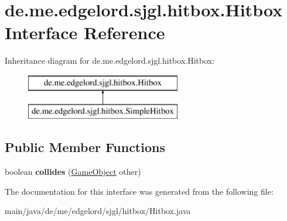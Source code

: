 \hypertarget{interfacede_1_1me_1_1edgelord_1_1sjgl_1_1hitbox_1_1_hitbox}{}\section{de.\+me.\+edgelord.\+sjgl.\+hitbox.\+Hitbox Interface Reference}
\label{interfacede_1_1me_1_1edgelord_1_1sjgl_1_1hitbox_1_1_hitbox}
Inheritance diagram for de.\+me.\+edgelord.\+sjgl.\+hitbox.\+Hitbox\+:\begin{figure}[H]
\begin{center}
\leavevmode
\includegraphics[height=2.000000cm]{interfacede_1_1me_1_1edgelord_1_1sjgl_1_1hitbox_1_1_hitbox}
\end{center}
\end{figure}
\subsection*{Public Member Functions}
\begin{DoxyCompactItemize}
\item 
\mbox{\label{interfacede_1_1me_1_1edgelord_1_1sjgl_1_1hitbox_1_1_hitbox_adc49223050f6d99c381e478b06af1d85}} 
boolean {\bfseries collides} (\mbox{\hyperlink{classde_1_1me_1_1edgelord_1_1sjgl_1_1gameobject_1_1_game_object}{Game\+Object}} other)
\end{DoxyCompactItemize}


The documentation for this interface was generated from the following file\+:\begin{DoxyCompactItemize}
\item 
main/java/de/me/edgelord/sjgl/hitbox/Hitbox.\+java\end{DoxyCompactItemize}
